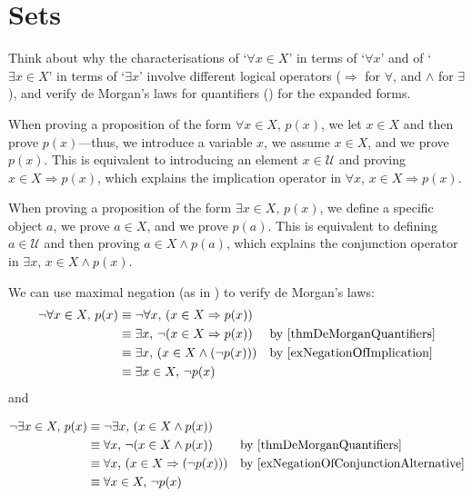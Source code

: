\section{Sets}

\begin{exercise}
Think about why the characterisations of `$\forall x \in X$' in terms of `$\forall x$' and of `$\exists x \in X$' in terms of `$\exists x$' involve different logical operators ($\Rightarrow$ for $\forall$, and $\wedge$ for $\exists$), and verify de Morgan's laws for quantifiers () for the expanded forms.
\end{exercise}

\begin{solutions*}
When proving a proposition of the form $\forall x \in X,\, p(x)$, we let $x \in X$ and then prove $p(x)$---thus, we introduce a variable $x$, we assume $x \in X$, and we prove $p(x)$. This is equivalent to introducing an element $x \in \mathcal{U}$ and proving $x \in X \Rightarrow p(x)$, which explains the implication operator in $\forall x,\, x \in X \Rightarrow p(x)$.

When proving a proposition of the form $\exists x \in X,\, p(x)$, we define a specific object $a$, we prove $a \in X$, and we prove $p(a)$. This is equivalent to defining $a \in \mathcal{U}$ and then proving $a \in X \wedge p(a)$, which explains the conjunction operator in $\exists x,\, x \in X \wedge p(x)$.

We can use maximal negation (as in ) to verify de Morgan's laws:
\begin{align*}
\neg \forall x \in X,\, p(x) &\equiv \neg \forall x,\, (x \in X \Rightarrow p(x)) && \\
&\equiv \exists x,\, \neg (x \in X \Rightarrow p(x)) && \text{by \Cref{thmDeMorganQuantifiers}} \\
&\equiv \exists x,\, (x \in X \wedge (\neg p(x))) && \text{by \Cref{exNegationOfImplication}} \\
&\equiv \exists x \in X,\, \neg p(x)
\end{align*}
and

\begin{align*}
\neg \exists x \in X,\, p(x) &\equiv \neg \exists x,\, (x \in X \wedge p(x)) && \\
&\equiv \forall x,\, \neg (x \in X \wedge p(x)) && \text{by \Cref{thmDeMorganQuantifiers}} \\
&\equiv \forall x,\, (x \in X \Rightarrow (\neg p(x))) && \text{by \Cref{exNegationOfConjunctionAlternative}} \\
&\equiv \forall x \in X,\, \neg p(x)
\end{align*}
\end{solutions*}

